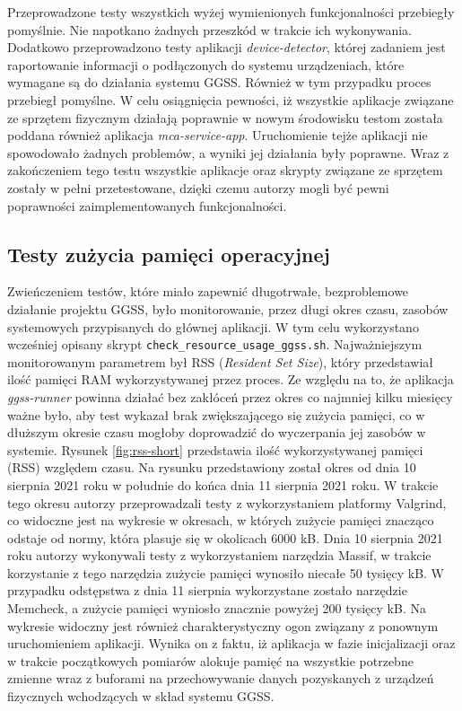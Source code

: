Przeprowadzone testy wszystkich wyżej wymienionych funkcjonalności przebiegły pomyślnie. Nie napotkano żadnych przeszkód w trakcie ich wykonywania. Dodatkowo przeprowadzono testy aplikacji \emph{device-detector}, której zadaniem jest raportowanie informacji o podłączonych do systemu urządzeniach, które wymagane są do działania systemu GGSS. Również w tym przypadku proces przebiegł pomyślne. W celu osiągnięcia pewności, iż wszystkie aplikacje związane ze sprzętem fizycznym działają poprawnie w nowym środowisku testom została poddana również aplikacja \emph{mca-service-app}. Uruchomienie tejże aplikacji nie spowodowało żadnych problemów, a wyniki jej działania były poprawne. Wraz z zakończeniem tego testu wszystkie aplikacje oraz skrypty związane ze sprzętem zostały w pełni przetestowane, dzięki czemu autorzy mogli być pewni poprawności zaimplementowanych funkcjonalności.


\subsection{Testy zużycia pamięci operacyjnej}

Zwieńczeniem testów, które miało zapewnić długotrwałe, bezproblemowe działanie projektu GGSS, było monitorowanie, przez długi okres czasu, zasobów systemowych przypisanych do głównej aplikacji. W tym celu wykorzystano wcześniej opisany skrypt \lstinline{check_resource_usage_ggss.sh}. Najważniejszym monitorowanym parametrem był RSS (\emph{Resident Set Size}), który przedstawiał ilość pamięci RAM wykorzystywanej przez proces. Ze względu na to, że aplikacja \emph{ggss-runner} powinna działać bez zakłóceń przez okres co najmniej kilku miesięcy ważne było, aby test wykazał brak zwiększającego się zużycia pamięci, co w dłuższym okresie czasu mogłoby doprowadzić do wyczerpania jej zasobów w systemie.
Rysunek \ref{fig:rss-short} przedstawia ilość wykorzystywanej pamięci (RSS) względem czasu. Na rysunku przedstawiony został okres od dnia 10 sierpnia 2021 roku w południe do końca dnia 11 sierpnia 2021 roku. W trakcie tego okresu autorzy przeprowadzali testy z wykorzystaniem platformy Valgrind, co widoczne jest na wykresie w okresach, w których zużycie pamięci znacząco odstaje od normy, która plasuje się w okolicach 6000 kB. Dnia 10 sierpnia 2021 roku autorzy wykonywali testy z wykorzystaniem narzędzia Massif, w trakcie korzystanie z tego narzędzia zużycie pamięci wynosiło niecałe 50 tysięcy kB. W przypadku odstępstwa z dnia 11 sierpnia wykorzystane zostało narzędzie Memcheck, a zużycie pamięci wyniosło znacznie powyżej 200 tysięcy kB. Na wykresie widoczny jest również charakterystyczny ogon związany z ponownym uruchomieniem aplikacji. Wynika on z faktu, iż aplikacja w fazie inicjalizacji oraz w trakcie początkowych pomiarów alokuje pamięć na wszystkie potrzebne zmienne wraz z buforami na przechowywanie danych pozyskanych z urządzeń fizycznych wchodzących w skład systemu GGSS.

